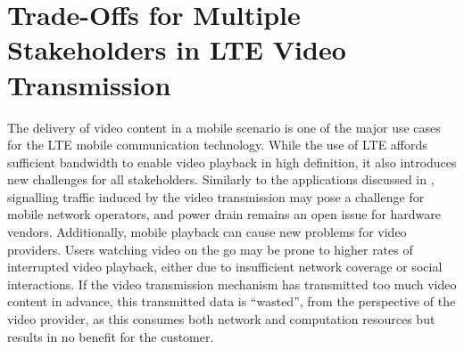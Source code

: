 \section{Trade-Offs for Multiple Stakeholders in LTE Video Transmission}\label{sec:application:lte_video}

\newcommand{\bandwidth}{\ensuremath{b_W}\xspace}
\newcommand{\bitrate}{\ensuremath{b_R}\xspace}
\newcommand{\timeplayedback}{\ensuremath{t_p}}

\newcommand{\streamingstart}{\ensuremath{\sigma}\xspace}
\newcommand{\bufferlower}{\ensuremath{\theta}\xspace}
\newcommand{\buffersize}{\ensuremath{\Theta}\xspace}

\newcommand{\ton}{\(T_{\texttt{ON}}\)\xspace}
\newcommand{\tdrxinactivity}{\(T_{\texttt{I}}\)\xspace}

\newcommand{\shortdrx}{\texttt{Short} \texttt{DRX}\xspace}
\newcommand{\tshortdrx}{\(T_{\texttt{S}}\)\xspace}
\newcommand{\longdrx}{\texttt{Long} \texttt{DRX}\xspace}
\newcommand{\tlongdrx}{\(T_{\texttt{L}}\)\xspace}
\newcommand{\rrcconnected}{\texttt{RRC\_Connected}\xspace}
\newcommand{\tidle}{\(T_{\texttt{Idle}}\)\xspace}
\newcommand{\tonidle}{\(T^{\texttt{Idle}}_{\texttt{ON}}\)\xspace}
\newcommand{\rrcidle}{\texttt{RRC\_Idle}\xspace}
\newcommand{\tdrxidle}{\(T^{\texttt{Idle}}_{\texttt{\gls{DRX}}}\)\xspace}
\newcommand{\promotiondelay}{\(D_P\)\xspace}

\newcommand{\bandwidthdown}{b_d\xspace}
\newcommand{\timedownloaded}{\ensuremath{t_d}}

\newcommand{\power}{P\xspace}
\newcommand{\energyconsumption}{\ensuremath{E}\xspace}
\newcommand{\connectioncount}{\ensuremath{C}\xspace}

\newcommand{\factordown}{\ensuremath{\alpha}\xspace}
\newcommand{\powerbaseline}{\ensuremath{\beta}\xspace}

\newcommand{\userabortrv}{\ensuremath{A}\xspace}
\newcommand{\userabortpdf}{\ensuremath{a}\xspace}
\newcommand{\meanwastedtraffic}{\ensuremath{W}\xspace}

\newcommand{\timeunwatched}{\ensuremath{t_u}}
\newcommand{\videolength}{l\xspace}

The delivery of video content in a mobile scenario is one of the major use cases for the \gls{LTE} mobile communication technology.
While the use of \gls{LTE} affords sufficient bandwidth to enable video playback in high definition, it also introduces new challenges for all stakeholders.
Similarly to the applications discussed in , signalling traffic induced by the video transmission may pose a challenge for mobile network operators, and power drain remains an open issue for hardware vendors.
Additionally, mobile playback can cause new problems for video providers.
Users watching video on the go may be prone to higher rates of interrupted video playback, either due to insufficient network coverage or social interactions.
If the video transmission mechanism has transmitted too much video content in advance, this transmitted data is ``wasted'', from the perspective of the video provider, as this consumes both network and computation resources but results in no benefit for the customer.

